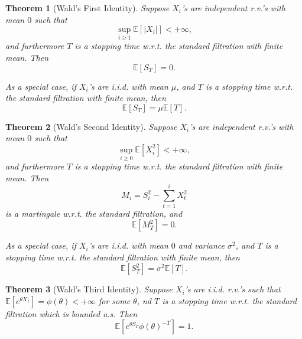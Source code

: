 \documentclass[openany]{book}
\newtheorem{theorem}{Theorem}[chapter]
\theoremstyle{definition}
\theoremstyle{remark}
\begin{document}
\begin{theorem}[Wald's First Identity]
    Suppose $X_i$'s are independent r.v.'s with mean $0$ such that
    \begin{equation*}
        \sup_{i\ge1}\mathbb{E}\left[|X_i|\right]<+\infty,
    \end{equation*}
    and furthermore $T$ is a stopping time w.r.t. the standard filtration with finite mean. Then
    \begin{equation*}
        \mathbb{E}[S_T]=0.
    \end{equation*}

    As a special case, if $X_i$'s are i.i.d. with mean $\mu$, and $T$ is a stopping time w.r.t. the standard filtration with finite mean, then
    \begin{equation*}
        \mathbb{E}[S_T]=\mu \mathbb{E}[T].
    \end{equation*}
\end{theorem}
\begin{theorem}[Wald's Second Identity]
    Suppose $X_i$'s are independent r.v.'s with mean $0$ such that
    \begin{equation*}
        \sup_{i\ge0}\mathbb{E}[X_i^2]<+\infty,
    \end{equation*}
    and furthermore $T$ is a stopping time w.r.t. the standard filtration with finite mean. Then
    \begin{equation*}
        M_i=S_i^2-\sum_{t=1}^{i}X_t^2
    \end{equation*}
    is a martingale w.r.t. the standard filtration, and
    \begin{equation*}
        \mathbb{E}[M_T^2]=0.
    \end{equation*}

    As a special case, if $X_i$'s are i.i.d. with mean $0$ and variance $\sigma^2$, and $T$ is a stopping time w.r.t. the standard filtration with finite mean, then
    \begin{equation*}
        \mathbb{E}[S_T^2]=\sigma^2 \mathbb{E}[T].
    \end{equation*}
\end{theorem}
\begin{theorem}[Wald's Third Identity]
    Suppose $X_i$'s are i.i.d. r.v.'s such that $\mathbb{E}[e^{\theta X_1}]=\phi(\theta)<+\infty$ for some $\theta$, nd $T$ is a stopping time w.r.t. the standard filtration which is bounded a.s. Then
    \begin{equation*}
        \mathbb{E}\left[e^{\theta S_T}\phi(\theta)^{-T}\right]=1.
    \end{equation*}
\end{theorem}
\end{document}

